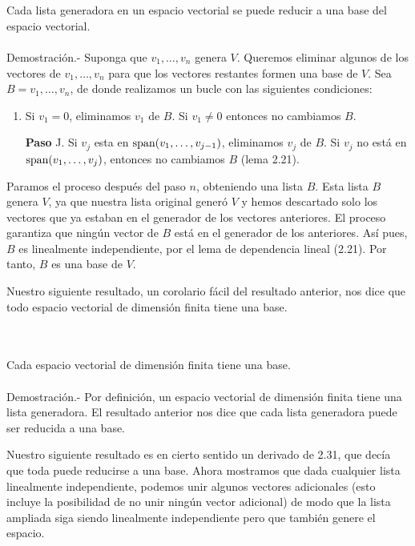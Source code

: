\setcounter{myteo}{30}
\begin{myteo}\,\\\\
    Cada lista generadora en un espacio vectorial se puede reducir a una base del espacio vectorial.\\\\
	Demostración.-\; Suponga que $v_1,\ldots,v_n$ genera $V$. Queremos eliminar algunos de los vectores de  $v_1,\ldots,v_n$ para que los vectores restantes formen una base de $V$. Sea $B=v_1,\ldots,v_n$, de donde realizamos un bucle con las siguientes condiciones:
	\begin{enumerate}
	    \item Si $v_1=0$, eliminamos $v_1$ de $B$. Si $v_1\neq 0$ entonces no cambiamos $B$.
	    \item[\textbf{Paso} J.] Si $v_j$ esta en $\mathop{\mbox{\normalfont span}}\nolimits(v_1,\ldots,v_{j-1})$, eliminamos $v_j$ de $B$. Si $v_j$ no está en $\mathop{\mbox{\normalfont span}}\nolimits(v_1,\ldots,v_j)$, entonces no cambiamos $B$ (lema 2.21). 
	\end{enumerate}
	Paramos el proceso después del paso $n$, obteniendo una lista $B$. Esta lista $B$ genera $V$, ya que nuestra lista original generó $V$ y hemos descartado solo los vectores que ya estaban en el generador de los vectores anteriores. El proceso garantiza que ningún vector de $B$ está en el generador de los anteriores. Así pues, $B$ es linealmente independiente, por el lema de dependencia lineal (2.21). Por tanto, $B$ es una base de $V$.
\end{myteo}

Nuestro siguiente resultado, un corolario fácil del resultado anterior, nos dice que todo espacio vectorial de dimensión finita tiene una base.

\setcounter{mycor}{31}
\begin{mycor}\,\\\\
    Cada espacio vectorial de dimensión finita tiene una base.\\\\
	Demostración.-\; Por definición, un espacio vectorial de dimensión finita tiene una lista generadora. El resultado anterior nos dice que cada lista generadora puede ser reducida a una base.
\end{mycor}

Nuestro siguiente resultado es en cierto sentido un derivado de 2.31, que decía que toda puede reducirse a una base. Ahora mostramos que dada cualquier lista linealmente independiente, podemos unir algunos vectores adicionales (esto incluye la posibilidad de no unir ningún vector adicional) de modo que la lista ampliada siga siendo linealmente independiente pero que también genere el espacio.

